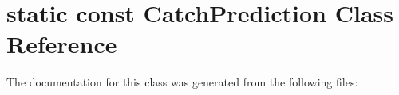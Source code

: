 \hypertarget{classstatic_01const_01CatchPrediction}{}\section{static const Catch\+Prediction Class Reference}
\label{classstatic_01const_01CatchPrediction}


The documentation for this class was generated from the following files\+: